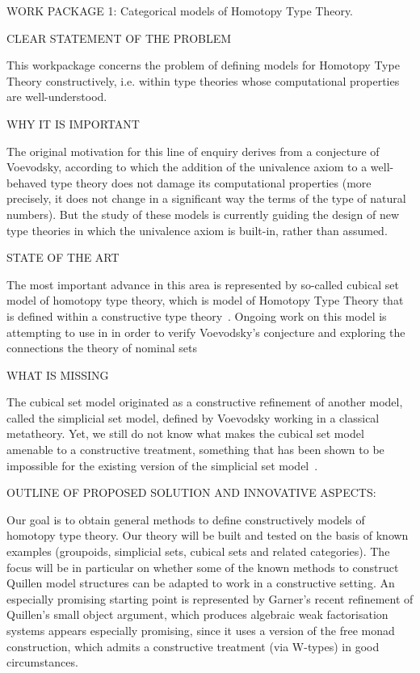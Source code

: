 WORK PACKAGE 1: Categorical models of Homotopy Type Theory.

CLEAR STATEMENT OF THE PROBLEM

This workpackage concerns the problem of defining models for Homotopy Type Theory constructively, i.e. within type theories whose computational properties are well-understood. 

WHY IT IS IMPORTANT

The original motivation for this line of enquiry derives from a conjecture of Voevodsky, according to which the addition of the univalence axiom to a well-behaved type theory does not damage its computational properties (more precisely, it does not change in a significant way the terms of the type of natural numbers). But the study of these models is currently guiding the design of new type theories in which the univalence axiom is built-in, rather than assumed. 

STATE OF THE ART

The most important advance in this area is represented by so-called cubical set model of homotopy type theory, which is model of Homotopy Type Theory that is defined within a constructive type theory~\cite{BezemCoquandHuber}. Ongoing work on this model is attempting to use in in order to verify Voevodsky's conjecture and exploring the connections the theory of nominal sets~\cite{Pitts} 

WHAT IS MISSING

The cubical set model originated as a constructive refinement of another model, called the simplicial set model, defined by Voevodsky working in a classical metatheory. Yet, we still do not know what makes the cubical set model amenable to a constructive treatment, something that has been shown to be impossible for the existing version of the simplicial set model~\cite{Bezem-Coquand}. 

OUTLINE OF PROPOSED SOLUTION AND INNOVATIVE ASPECTS:

Our goal is to obtain general methods to define  constructively models of homotopy type theory. Our theory will be built and tested on the basis of known examples
(groupoids, simplicial sets, cubical sets and related categories). The focus will be in particular on whether some of the known methods to construct Quillen model structures can be adapted to work in a constructive setting. An especially promising starting point is represented by Garner's recent refinement of Quillen's small object argument, which produces algebraic weak factorisation systems appears especially promising, since it uses a version of the free monad construction, which admits a constructive treatment (via W-types) in good circumstances.

